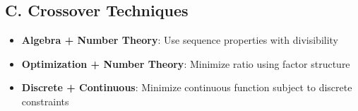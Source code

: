 \documentclass[11pt]{article}
\begin{document}
\begin{tacticalbox}
\subsection*{C. Crossover Techniques}
\begin{itemize}[leftmargin=*]
    \item \textbf{Algebra + Number Theory}: Use sequence properties with divisibility
    
    \item \textbf{Optimization + Number Theory}: Minimize ratio using factor structure
    
    \item \textbf{Discrete + Continuous}: Minimize continuous function subject to discrete constraints
\end{itemize}
\end{tacticalbox}
\end{document}
